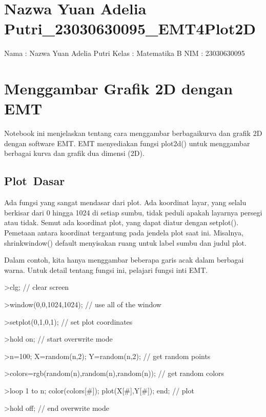\documentclass[
]{book}
\author{}
\date{}
\begin{document}
\frontmatter

\mainmatter
\chapter{Nazwa Yuan Adelia Putri\_23030630095\_EMT4Plot2D}\label{nazwa-yuan-adelia-putri_23030630095_emt4plot2d}

Nama : Nazwa Yuan Adelia Putri Kelas : Matematika B NIM : 23030630095

\chapter{Menggambar Grafik 2D dengan EMT}\label{menggambar-grafik-2d-dengan-emt}

Notebook ini menjelaskan tentang cara menggambar berbagaikurva dan grafik 2D dengan software EMT. EMT menyediakan fungsi plot2d() untuk menggambar berbagai kurva dan grafik dua dimensi (2D).

\section{Plot~Dasar}\label{plot-dasar}

Ada fungsi yang sangat mendasar dari plot. Ada koordinat layar, yang selalu berkisar dari 0 hingga 1024 di setiap sumbu, tidak peduli apakah layarnya persegi atau tidak. Semut ada koordinat plot, yang dapat diatur dengan setplot(). Pemetaan antara koordinat tergantung pada jendela plot saat ini. Misalnya, shrinkwindow() default menyisakan ruang untuk label sumbu dan judul plot.

Dalam contoh, kita hanya menggambar beberapa garis acak dalam berbagai warna. Untuk detail tentang fungsi ini, pelajari fungsi inti EMT.

\textgreater clg; // clear screen

\textgreater window(0,0,1024,1024); // use all of the window

\textgreater setplot(0,1,0,1); // set plot coordinates

\textgreater hold on; // start overwrite mode

\textgreater n=100; X=random(n,2); Y=random(n,2); // get random points

\textgreater colors=rgb(random(n),random(n),random(n)); // get random colors

\textgreater loop 1 to n; color(colors{[}\#{]}); plot(X{[}\#{]},Y{[}\#{]}); end; // plot

\textgreater hold off; // end overwrite mode
\end{document}
